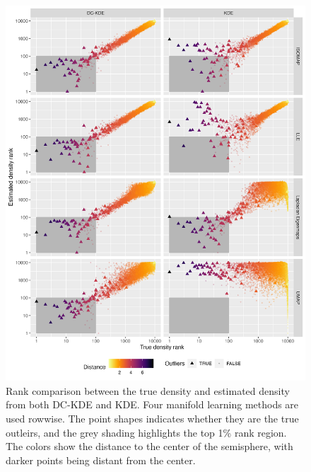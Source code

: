 \documentclass[11pt,a4paper,]{article}
\begin{document}
\begin{figure}

{\centering \includegraphics[width=0.95\linewidth]{figures/sim4d10000_density_comparison_4ml_radius10_k200_rankdensity_circleoutlier_with1rec} 

}

\caption{Rank comparison between the true density and estimated density from both DC-KDE and KDE. Four manifold learning methods are used rowwise. The point shapes indicates whether they are the true outleirs, and the grey shading highlights the top 1\% rank region. The colors show the distance to the center of the semisphere, with darker points being distant from the center.}\label{fig:fivedisomapden}
\end{figure}
\end{document}
